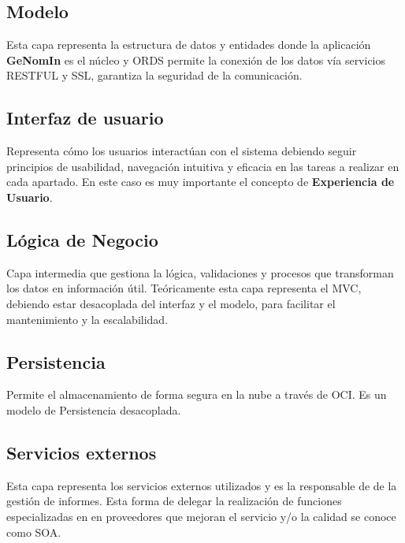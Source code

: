 \subsection{Modelo}
Esta capa representa la estructura de datos y entidades donde la aplicación \textbf{GeNomIn} es el núcleo y \acrfull{ORDS} permite la conexión de los datos vía servicios \acrshort{RESTFUL} y \acrshort{SSL}, garantiza la seguridad de la comunicación.
\subsection{Interfaz de usuario}
Representa cómo los usuarios interactúan con el sistema debiendo seguir principios de usabilidad, navegación intuitiva y eficacia en las tareas a realizar en cada apartado. En este caso es muy importante el concepto de \textbf{Experiencia de Usuario}.
\subsection{Lógica de Negocio}
Capa intermedia que gestiona la lógica, validaciones y procesos que transforman los datos en información útil.
Teóricamente esta capa representa el \acrshort{MVC}, debiendo estar desacoplada del interfaz y el modelo, para facilitar el mantenimiento y la escalabilidad.
\subsection{Persistencia}
Permite el almacenamiento de forma segura en la nube a través de \acrshort{OCI}. Es un modelo de \gls{Persistencia desacoplada}.
\subsection{Servicios externos}
Esta capa representa los servicios externos utilizados y es la responsable de de la gestión de informes. Esta forma de delegar la realización de funciones especializadas en en proveedores que mejoran el servicio y/o la calidad se conoce como \acrfull{SOA}.